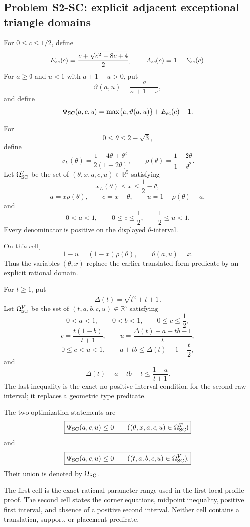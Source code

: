 \subsection{Problem S2-SC: explicit adjacent exceptional triangle domains}

For \(0\le c\le1/2\), define
\[
 E_{\rm sc}(c)
 =\frac{c+\sqrt{c^2-8c+4}}2,
 \qquad
 A_{\rm sc}(c)=1-E_{\rm sc}(c).
\]
For \(a\ge0\) and \(u<1\) with \(a+1-u>0\), put
\[
 \vartheta(a,u)=\frac{a}{a+1-u},
\]
and define
\[
 \Psi_{\rm SC}(a,c,u)
 =\max\{a,\vartheta(a,u)\}+E_{\rm sc}(c)-1.
\]

\begin{definition}
\label{def:s2-sc-t3-domain}
For
\[
 0\le\theta\le2-\sqrt3,
\]
define
\[
 x_L(\theta)
 =\frac{1-4\theta+\theta^2}{2(1-2\theta)},
 \qquad
 \rho(\theta)=\frac{1-2\theta}{1-\theta^2}.
\]
Let \(\Omega_{\rm SC}^{T}\) be the set of
\((\theta,x,a,c,u)\in\mathbb R^5\) satisfying
\[
 x_L(\theta)\le x\le\frac12-\theta,
\]
\[
 a=x\rho(\theta),\qquad
 c=x+\theta,\qquad
 u=1-\rho(\theta)+a,
\]
and
\[
 0<a<1,\qquad
 0\le c\le\frac12,\qquad
 \frac12\le u<1.
\]
Every denominator is positive on the displayed \(\theta\)-interval.
\end{definition}

On this cell,
\[
 1-u=(1-x)\rho(\theta),
 \qquad
 \vartheta(a,u)=x.
\]
Thus the variables \((\theta,x)\) replace the earlier translated-form
predicate by an explicit rational domain.

\begin{definition}
\label{def:s2-sc-vd1-domain}
For \(t\ge1\), put
\[
 \Delta(t)=\sqrt{t^2+t+1}.
\]
Let \(\Omega_{\rm SC}^{V}\) be the set of
\((t,a,b,c,u)\in\mathbb R^5\) satisfying
\[
 0<a<1,\qquad 0<b<1,\qquad 0\le c\le\frac12,
\]
\[
 c=\frac{t(1-b)}{t+1},
 \qquad
 u=\frac{\Delta(t)-a-tb-1}{t},
\]
\[
 0\le c<u<1,
 \qquad
 a+tb\le\Delta(t)-1-\frac t2,
\]
and
\[
 \Delta(t)-a-tb-t
 \le\frac{1-a}{t+1}.
\]
The last inequality is the exact no-positive-interval condition for the
second raw interval; it replaces a geometric type predicate.
\end{definition}

\begin{definition}[Problem S2-SC]
\label{prob:s2-rescuer}
The two optimization statements are
\[
 \boxed{
 \Psi_{\rm SC}(a,c,u)\le0
 \qquad
 ((\theta,x,a,c,u)\in\Omega_{\rm SC}^{T})
 }
\]
and
\[
 \boxed{
 \Psi_{\rm SC}(a,c,u)\le0
 \qquad
 ((t,a,b,c,u)\in\Omega_{\rm SC}^{V}).
 }
\]
Their union is denoted by \(\Omega_{\rm SC}\).
\end{definition}

The first cell is the exact rational parameter range used in the first local
profile proof.  The second cell states the corner equations, midpoint
inequality, positive first interval, and absence of a positive second
interval.  Neither cell contains a translation, support, or placement
predicate.
